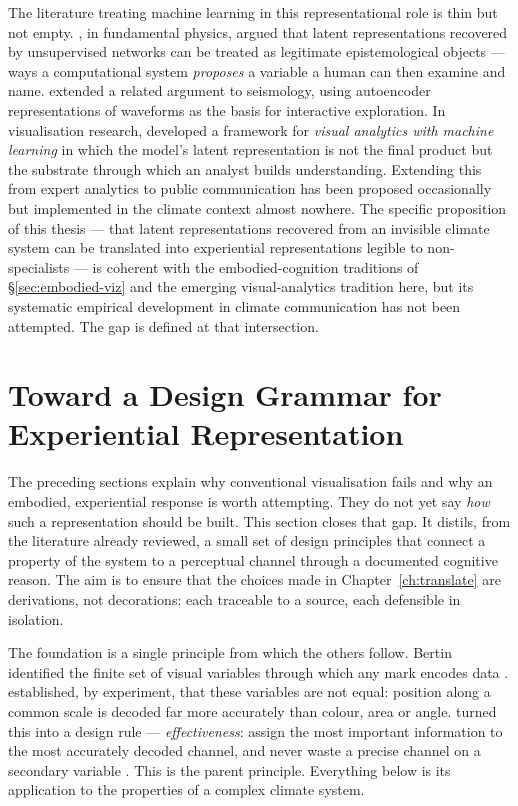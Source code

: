The literature treating machine learning in this representational role is thin but not empty. \citet{iten2020}, in fundamental physics, argued that latent representations recovered by unsupervised networks can be treated as legitimate epistemological objects --- ways a computational system \emph{proposes} a variable a human can then examine and name. \citet{camps2019} extended a related argument to seismology, using autoencoder representations of waveforms as the basis for interactive exploration. In visualisation research, \citet{sacha2018} developed a framework for \emph{visual analytics with machine learning} in which the model's latent representation is not the final product but the substrate through which an analyst builds understanding. Extending this from expert analytics to public communication has been proposed occasionally \citep{munzner2014, cabrera2023} but implemented in the climate context almost nowhere. The specific proposition of this thesis --- that latent representations recovered from an invisible climate system can be translated into experiential representations legible to non-specialists --- is coherent with the embodied-cognition traditions of §\ref{sec:embodied-viz} and the emerging visual-analytics tradition here, but its systematic empirical development in climate communication has not been attempted. The gap is defined at that intersection.

\section{Toward a Design Grammar for Experiential Representation}
\label{sec:design-grammar}

The preceding sections explain why conventional visualisation fails and why an embodied, experiential response is worth attempting. They do not yet say \emph{how} such a representation should be built. This section closes that gap. It distils, from the literature already reviewed, a small set of design principles that connect a property of the system to a perceptual channel through a documented cognitive reason. The aim is to ensure that the choices made in Chapter~\ref{ch:translate} are derivations, not decorations: each traceable to a source, each defensible in isolation.

The foundation is a single principle from which the others follow. Bertin identified the finite set of visual variables through which any mark encodes data \citep{bertin1983}. \citet{clevelandmcgill1984} established, by experiment, that these variables are not equal: position along a common scale is decoded far more accurately than colour, area or angle. \citet{munzner2014} turned this into a design rule --- \emph{effectiveness}: assign the most important information to the most accurately decoded channel, and never waste a precise channel on a secondary variable \citep{ware2021}. This is the parent principle. Everything below is its application to the properties of a complex climate system.

